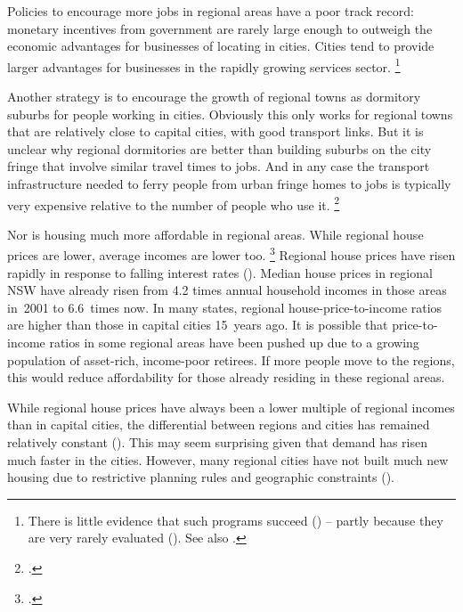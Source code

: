 Policies to encourage more jobs in regional areas have a poor track record: monetary incentives from government are rarely large enough to outweigh the economic advantages for businesses of locating in cities. Cities tend to provide larger advantages for businesses in the rapidly growing services sector.%
    \footnote{There is little evidence that such programs succeed (\textcite[][176--187]{PC-2017-Transitioning-regions}) -- partly because they are very rarely evaluated (\textcite[][148--152]{PC-2017-Transitioning-regions}).
    See also \textcite{DaleyLancy2011-Investing-regions}.}

Another strategy is to encourage the growth of regional towns as dormitory suburbs for people working in cities.
Obviously this only works for regional towns that are relatively close to capital cities, with good transport links.
But it is unclear why regional dormitories are better than building suburbs on the city fringe that involve similar travel times to jobs. And in any case the transport infrastructure needed to ferry people from urban fringe homes to jobs is typically very expensive relative to the number of people who use it.%
    \footcite{Terrill2016Roadsrichesbetter}

Nor is housing much more affordable in regional areas.
While regional house prices are lower, average incomes are lower too.%
\footcite[][8]{DaleyWoodChivers2017RegPatterns}
Regional house prices have risen rapidly in response to falling interest rates ().
Median house prices in regional NSW have already risen from 4.2 times annual household incomes in those areas in~2001 to 6.6~times now. In many states, regional house-price-to-income ratios are higher than those in capital cities 15~years ago.
It is possible that price-to-income ratios in some regional areas have been pushed up due to a growing population of asset-rich, income-poor retirees.
If more people move to the regions, this would reduce affordability for those already residing in these regional areas.

While regional house prices have always been a lower multiple of regional incomes than in capital cities, the differential between regions and cities has remained relatively constant ().
This may seem surprising given that demand has risen much faster in the cities.
However, many regional cities have not built much new housing due to restrictive planning rules and geographic constraints ().

